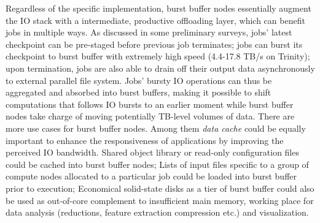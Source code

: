 

Regardless of the specific implementation, burst buffer nodes essentially augment
the IO stack with a intermediate, productive offloading layer, 
which can benefit jobs in multiple ways.
As discussed in some preliminary surveys\cite{BBUseCase},
jobs' latest checkpoint can be pre-staged
before previous job terminates;
jobs can burst its checkpoint to burst buffer
with extremely high speed (4.4-17.8 TB/s on Trinity);
upon termination, jobs are also able to drain off their output data
asynchronously to external parallel file system.
Jobs' bursty IO operations can thus be aggregated and absorbed into burst buffers,
making it possible to shift computations that follows IO bursts to an earlier moment
while burst buffer nodes take charge of moving potentially TB-level volumes of data.
There are more use cases for burst buffer nodes.
Among them \textit{data cache} could be equally important to enhance the responsiveness
of applications by improving the perceived IO bandwidth\cite{BBUseCase}.
Shared object library or read-only configuration files could be
cached into burst buffer nodes;
Lists of input files specific to a group of compute nodes allocated to
a particular job could be loaded into burst buffer prior to execution;
Economical solid-state disks as a tier of burst buffer could also be used as
out-of-core complement to insufficient main memory\cite{Romanus:CORR:15},
working place for data analysis (reductions, feature extraction compression etc.)
and visualization\cite{BBUseCase}.


